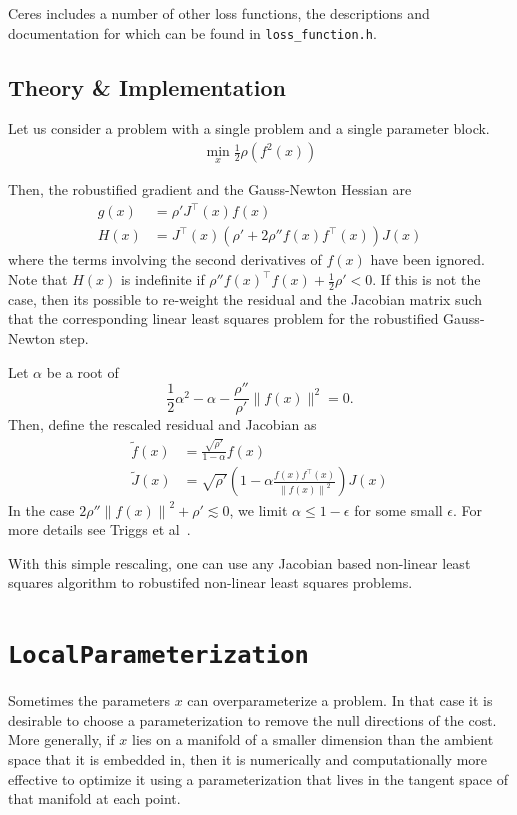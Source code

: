 Ceres includes a number of other loss functions, the descriptions and
documentation for which can be found in \texttt{loss\_function.h}.

\subsection{Theory \& Implementation}
Let us consider a problem with a single problem and a single parameter
block.
\begin{align}
\min_x \frac{1}{2}\rho(f^2(x))
\end{align}

Then, the robustified gradient and the Gauss-Newton Hessian are
\begin{align}
	g(x) &= \rho'J^\top(x)f(x)\\
	H(x) &= J^\top(x)\left(\rho' + 2 \rho''f(x)f^\top(x)\right)J(x)
\end{align}
where the terms involving the second derivatives of $f(x)$ have been ignored. Note that $H(x)$ is indefinite if $\rho''f(x)^\top f(x) + \frac{1}{2}\rho' < 0$. If this is not the case, then its possible to re-weight the residual and the Jacobian matrix such that the corresponding linear least squares problem for the robustified Gauss-Newton step.


Let $\alpha$ be a root of
\begin{equation}
	\frac{1}{2}\alpha^2 - \alpha - \frac{\rho''}{\rho'}\|f(x)\|^2 = 0.
\end{equation}
Then, define the rescaled residual and Jacobian as
\begin{align}
	\tilde{f}(x) &= \frac{\sqrt{\rho'}}{1 - \alpha} f(x)\\
	\tilde{J}(x) &= \sqrt{\rho'}\left(1 - \alpha \frac{f(x)f^\top(x)}{\left\|f(x)\right\|^2} \right)J(x)
\end{align}
In the case $2 \rho''\left\|f(x)\right\|^2 + \rho' \lesssim 0$, we limit $\alpha \le 1- \epsilon$ for some small $\epsilon$. For more details see Triggs et al~\cite{triggs-etal-1999}.

With this simple rescaling, one can use any Jacobian based non-linear least squares algorithm to robustifed non-linear least squares problems.

\section{\texttt{LocalParameterization}}
Sometimes the parameters $x$ can overparameterize a problem. In
that case it is desirable to choose a parameterization to remove
the null directions of the cost. More generally, if $x$ lies on a
manifold of a smaller dimension than the ambient space that it is
embedded in, then it is numerically and computationally more
effective to optimize it using a parameterization that lives in
the tangent space of that manifold at each point.

